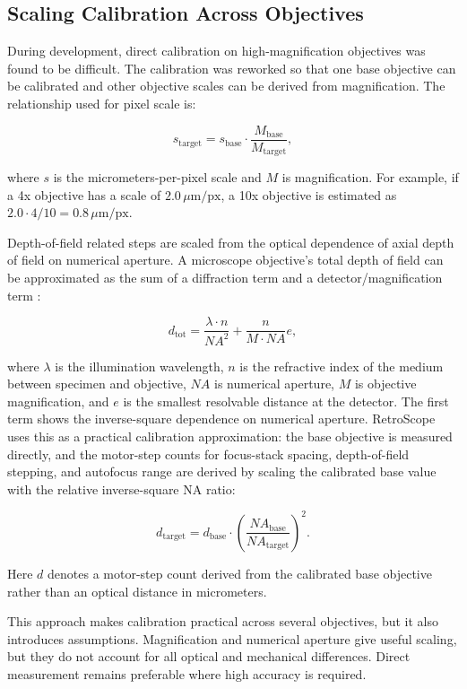\subsection{Scaling Calibration Across Objectives}

During development, direct calibration on high-magnification objectives was found to be difficult. The calibration was reworked so that one base objective can be calibrated and other objective scales can be derived from magnification. The relationship used for pixel scale is:

\[
    s_{\mathrm{target}} = s_{\mathrm{base}} \cdot \frac{M_{\mathrm{base}}}{M_{\mathrm{target}}},
\]

where \(s\) is the micrometers-per-pixel scale and \(M\) is magnification. For example, if a 4x objective has a scale of \(2.0\,\mu\mathrm{m/px}\), a 10x objective is estimated as \(2.0 \cdot 4 / 10 = 0.8\,\mu\mathrm{m/px}\).

Depth-of-field related steps are scaled from the optical dependence of axial depth of field on numerical aperture. A microscope objective's total depth of field can be approximated as the sum of a diffraction term and a detector/magnification term \cite{nikonDepthField}:

\[
    d_{\mathrm{tot}} =
    \frac{\lambda \cdot n}{NA^2} + \frac{n }{M \cdot NA} e,
\]

where \(\lambda\) is the illumination wavelength, \(n\) is the refractive index of the medium between specimen and objective, \(NA\) is numerical aperture, \(M\) is objective magnification, and \(e\) is the smallest resolvable distance at the detector. The first term shows the inverse-square dependence on numerical aperture. RetroScope uses this as a practical calibration approximation: the base objective is measured directly, and the motor-step counts for focus-stack spacing, depth-of-field stepping, and autofocus range are derived by scaling the calibrated base value with the relative inverse-square NA ratio:

\[
    d_{\mathrm{target}} = d_{\mathrm{base}} \cdot
    \left(\frac{NA_{\mathrm{base}}}{NA_{\mathrm{target}}}\right)^2.
\]

Here \(d\) denotes a motor-step count derived from the calibrated base objective rather than an optical distance in micrometers.

This approach makes calibration practical across several objectives, but it also introduces assumptions. Magnification and numerical aperture give useful scaling, but they do not account for all optical and mechanical differences. Direct measurement remains preferable where high accuracy is required.


